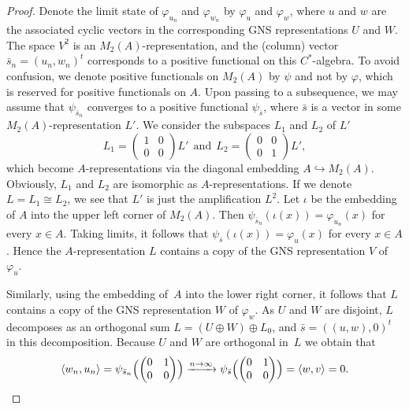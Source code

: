 \documentclass[12pt,reqno]{amsart}
\theoremstyle{definition}
\begin{document}
\begin{proof}
    Denote the limit state of $\varphi_{u_n}$ and $\varphi_{w_n}$ by $\varphi_u$ and $\varphi_w$, where $u$ and $w$ are the associated cyclic vectors in the corresponding GNS representations $U$ and $W$. The space $V^2$ is an $M_2(A)$-representation, and the (column) vector $\bar{s}_n=(u_n, w_n )^t$ corresponds to a positive functional on this $C^*$-algebra. To avoid confusion, we denote positive functionals on $M_2(A)$ by $\psi$ and not by $\varphi$, which is reserved for positive functionals on $A$. Upon passing to a subsequence, we may assume that $\psi_{\bar{s}_n}$ converges to a positive functional $\psi_{\bar{s}}$, where $\bar{s}$ is a vector in some $M_2(A)$-representation $L'$. We consider the subspaces $L_1$ and $L_2$ of $L'$ 
    \[
    L_1=\begin{pmatrix} 1 &0 \\ 0 & 0 \end{pmatrix} L'~~\text{and}~~L_2=\begin{pmatrix} 0 & 0 \\ 0 & 1 \end{pmatrix} L', 
    \]
     which become $A$-representations via the diagonal embedding $A\hookrightarrow M_2(A)$. Obviously, $L_1$ and $L_2$ are isomorphic as $A$-representations.  If we denote $L=L_1\cong L_2$, we see that $L'$ is just the amplification $L^2$. Let $\iota$ be the embedding of $A$ into the upper left corner of $M_2(A)$. Then $\psi_{\bar{s}_n}(\iota (x))=\varphi_{u_n}(x)$ for every $x \in A$. Taking limits, it follows that $\psi_{\bar{s}}(\iota(x))=\varphi_{u}(x)$ for every $x \in A$. Hence the $A$-representation $L$ contains a copy of the GNS representation $V$ of $\varphi_{u}$. 
     
     Similarly, using the embedding of~$A$ into the lower right corner, it follows that $L$ contains a copy of the GNS representation $W$ of $\varphi_{w}$. As $U$ and $W$ are disjoint, $L$ decomposes as an orthogonal sum $L=(U \oplus W) \oplus L_0$, and $\bar{s} = ((u, w), 0)^t$ in this decomposition. Because $U$ and $W$ are orthogonal in~$L$ we obtain that 
     \[
\langle w_n,u_n \rangle=\psi_{\bar{s}_n}\Bigl(\begin{pmatrix} 0 & 1 \\ 0 & 0 \end{pmatrix}\Bigr)\xrightarrow{n\to\infty}\psi_{\bar{s}}\Bigl(\begin{pmatrix} 0 & 1 \\ 0 & 0 \end{pmatrix}\Bigr)=\langle w, v\rangle=0.\qedhere
     \]
\end{proof}
 
\end{document}
